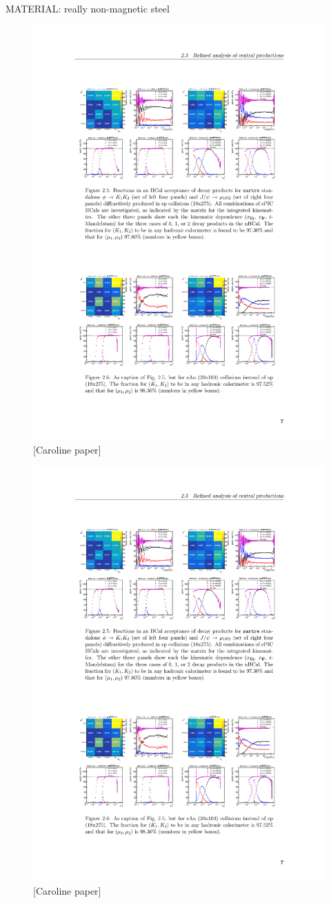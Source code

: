 MATERIAL:
really non-magnetic steel

\pagebreak

\begin{figure}[H]
    \centering
    \includegraphics[width=.7\linewidth]{img/e+Au-phi(KK).pdf}
    \caption{[Caroline paper]}
    \label{fig:nhcal:e+Au-phi(KK)}
\end{figure}

\begin{figure}[H]
    \centering
    \includegraphics[width=.7\linewidth]{img/K1K2matica.pdf}
    \caption{[Caroline paper]}
    \label{fig:nhcal:K1K2matica}
\end{figure}
